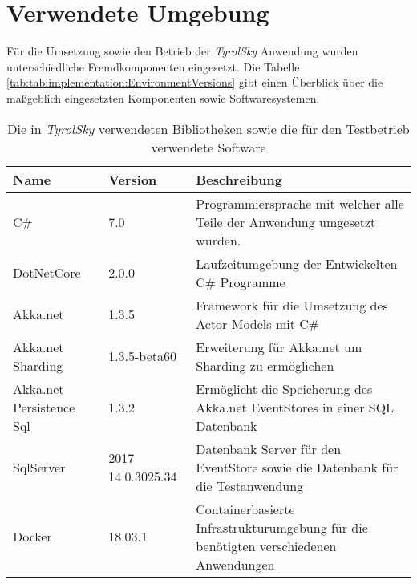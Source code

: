 
\section{Verwendete Umgebung}
Für die Umsetzung sowie den Betrieb der \textit{TyrolSky} Anwendung wurden unterschiedliche Fremdkomponenten eingesetzt. Die Tabelle \ref{tab:tab:implementation:EnvironmentVersions} gibt einen Überblick über die maßgeblich eingesetzten Komponenten sowie Softwaresystemen. 

\begin{table}[h]
    \centering
    \begin{tabular}{llp{6.5cm}}
    Name            & Version       & Beschreibung \\ \hline
    C\#          & 7.0               &  Programmiersprache mit welcher alle Teile der Anwendung umgesetzt wurden. \\
    DotNetCore      & 2.0.0             &  Laufzeitumgebung der Entwickelten C\# Programme \\
    Akka.net        & 1.3.5             & Framework für die Umsetzung des Actor Models mit C\# \\
    Akka.net Sharding & 1.3.5-beta60    & Erweiterung für Akka.net um Sharding zu ermöglichen \\
    Akka.net Persistence Sql & 1.3.2    & Ermöglicht die Speicherung des Akka.net EventStores in einer SQL Datenbank\\
    SqlServer       & 2017 14.0.3025.34 & Datenbank Server für den EventStore sowie die Datenbank für die Testanwendung\\
    Docker          & 18.03.1           & Containerbasierte Infrastrukturumgebung für die benötigten verschiedenen Anwendungen\\
    \end{tabular}
    \caption{Die in \textit{TyrolSky} verwendeten Bibliotheken sowie die für den Testbetrieb verwendete Software}
    \label{tab:implementation:EnvironmentVersions}
    \end{table}